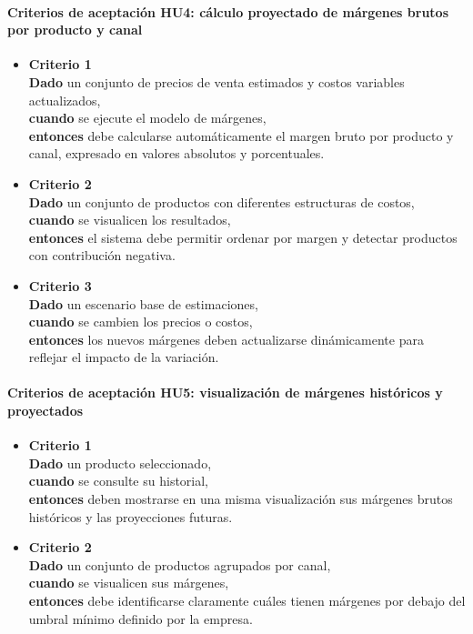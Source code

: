 \documentclass[
11pt, %
]{charter}
\begin{document}
\paragraph{Criterios de aceptación HU4: cálculo proyectado de márgenes brutos por producto y canal}
\begin{itemize}
  \item \textbf{Criterio 1} \\
  \textbf{Dado} un conjunto de precios de venta estimados y costos variables actualizados, \\
  \textbf{cuando} se ejecute el modelo de márgenes, \\
  \textbf{entonces} debe calcularse automáticamente el margen bruto por producto y canal, expresado en valores absolutos y porcentuales.

  \item \textbf{Criterio 2} \\
  \textbf{Dado} un conjunto de productos con diferentes estructuras de costos, \\
  \textbf{cuando} se visualicen los resultados, \\
  \textbf{entonces} el sistema debe permitir ordenar por margen y detectar productos con contribución negativa.

  \item \textbf{Criterio 3} \\
  \textbf{Dado} un escenario base de estimaciones, \\
  \textbf{cuando} se cambien los precios o costos, \\
  \textbf{entonces} los nuevos márgenes deben actualizarse dinámicamente para reflejar el impacto de la variación.
\end{itemize}

\vspace{1em}

\paragraph{Criterios de aceptación HU5: visualización de márgenes históricos y proyectados}
\begin{itemize}
  \item \textbf{Criterio 1} \\
  \textbf{Dado} un producto seleccionado, \\
  \textbf{cuando} se consulte su historial, \\
  \textbf{entonces} deben mostrarse en una misma visualización sus márgenes brutos históricos y las proyecciones futuras.

  \item \textbf{Criterio 2} \\
  \textbf{Dado} un conjunto de productos agrupados por canal, \\
  \textbf{cuando} se visualicen sus márgenes, \\
  \textbf{entonces} debe identificarse claramente cuáles tienen márgenes por debajo del umbral mínimo definido por la empresa.
\end{itemize}
\end{document}
